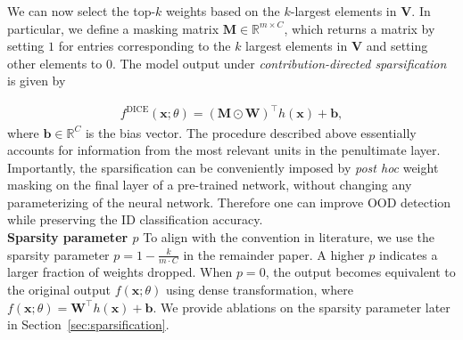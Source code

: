 \documentclass[runningheads]{llncs}
\def\*#1{\mathbf{#1}}
\begin{document}
We can now select the top-$k$ weights based on the $k$-largest elements in $\*V$.  In particular, we define a masking matrix $\*M \in \mathbb{R}^{m\times C}$, which returns a matrix by setting $1$ for entries corresponding to the $k$ largest elements in $\*V$ and setting other elements to $0$.
The model output under \emph{contribution-directed sparsification} is given by

\begin{align}
f^{\text{DICE}}(\*x;\theta) = (\*M\odot\*W)^\top h(\*x) + \mathbf{b},
\end{align}
where $\mathbf{b} \in \mathbb{R}^C$ is the bias vector. The procedure described above essentially accounts for information from the most relevant units in the penultimate layer. Importantly, the sparsification can be conveniently imposed by \emph{post hoc} weight masking on the final layer of a pre-trained network, without changing any parameterizing of the neural network. Therefore one can improve OOD detection while preserving the ID classification accuracy. \\

\noindent \textbf{Sparsity parameter $p$} To align with the convention in literature, we use the sparsity parameter $p= 1- \frac{k}{m\cdot C}$ in the remainder paper. A higher $p$ indicates a larger fraction of weights dropped. When $p=0$, the output becomes equivalent to the original output $f(\*x;\theta)$ using dense transformation, where $f(\*x;\theta) = \*W^\top h(\*x) + \*b$. We provide ablations on the sparsity parameter later in Section~\ref{sec:sparsification}.
\end{document}
